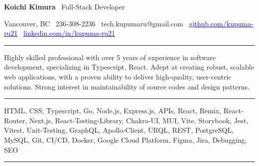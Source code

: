 \documentclass{article}
\newcommand{\link}[2]{\href{#1}{\textcolor{blue}{\uline{#2}}}}
\begin{document}
\begin{center}
    {\LARGE \textbf{Koichi Kimura} \textbar\ \LARGE Full-Stack Developer}
\end{center}
\begin{center}
    Vancouver, BC \textbar\ 236-308-2236 \textbar\ tech.kupumaru@gmail.com \textbar\
    \link{https://github.com/kupuma-ru21}{github.com/kupuma-ru21} \textbar\
    \link{https://www.linkedin.com/in/kupuma-ru21}{linkedin.com/in/kupuma-ru21}
\end{center}

\par
\vspace{-1em}
\noindent\rule{\textwidth}{0.1pt}
\noindent
Highly skilled professional with over 5 years of experience in software development, specializing in Typescript, React. Adept at creating robust, scalable web applications, with a proven ability to deliver high-quality, user-centric solutions. Strong interest in maintainability of source codes and design patterns.

\vspace{1em}

\par
\vspace{-1em}
\noindent\rule{\textwidth}{0.1pt}

\noindent
HTML, CSS, Typescript, Go, Node.js, Express.js, APIs, React, Remix, React-Router, Next.js, React-Testing-Library, Chakra-UI, MUI, Vite, Storybook, Jest, Vitest, Unit-Testing, GraphQL, Apollo-Client, URQL, REST, PostgreSQL, MySQL, Git, CI/CD, Docker, Google Cloud Platform, Figma, Jira, Debugging, SEO
\noindent

\vspace{1em}

\par
\vspace{-1em}
\noindent\rule{\textwidth}{0.1pt}
\vspace{0.3em}
\end{document}
